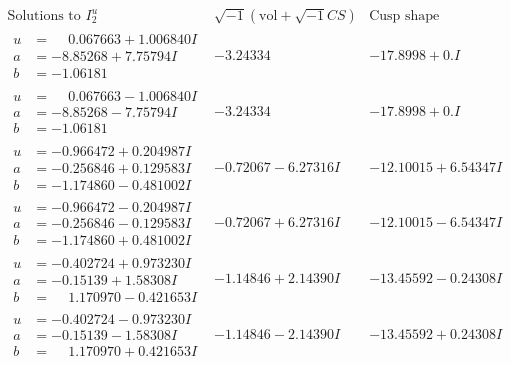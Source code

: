\documentclass[1p]{elsarticle_modified}
\theoremstyle{definition}
\newcommand{\I}{\sqrt{-1}}
\begin{document}
$$\begin{array}{c|c|c}  
\text{Solutions to }I^u_{2}& \I (\text{vol} + \sqrt{-1}CS) & \text{Cusp shape}\\
 \hline 
\begin{aligned}
u &= \phantom{-}0.067663 + 1.006840 I \\
a &= -8.85268 + 7.75794 I \\
b &= -1.06181\phantom{ +0.000000I}\end{aligned}
 & -3.24334\phantom{ +0.000000I} & -17.8998 + 0. I\phantom{ +0.000000I} \\ \hline\begin{aligned}
u &= \phantom{-}0.067663 - 1.006840 I \\
a &= -8.85268 - 7.75794 I \\
b &= -1.06181\phantom{ +0.000000I}\end{aligned}
 & -3.24334\phantom{ +0.000000I} & -17.8998 + 0. I\phantom{ +0.000000I} \\ \hline\begin{aligned}
u &= -0.966472 + 0.204987 I \\
a &= -0.256846 + 0.129583 I \\
b &= -1.174860 - 0.481002 I\end{aligned}
 & -0.72067 - 6.27316 I & -12.10015 + 6.54347 I \\ \hline\begin{aligned}
u &= -0.966472 - 0.204987 I \\
a &= -0.256846 - 0.129583 I \\
b &= -1.174860 + 0.481002 I\end{aligned}
 & -0.72067 + 6.27316 I & -12.10015 - 6.54347 I \\ \hline\begin{aligned}
u &= -0.402724 + 0.973230 I \\
a &= -0.15139 + 1.58308 I \\
b &= \phantom{-}1.170970 - 0.421653 I\end{aligned}
 & -1.14846 + 2.14390 I & -13.45592 - 0.24308 I \\ \hline\begin{aligned}
u &= -0.402724 - 0.973230 I \\
a &= -0.15139 - 1.58308 I \\
b &= \phantom{-}1.170970 + 0.421653 I\end{aligned}
 & -1.14846 - 2.14390 I & -13.45592 + 0.24308 I \\ \hline\begin{aligned}

\end{aligned}
\end{array}$$
\end{document}
